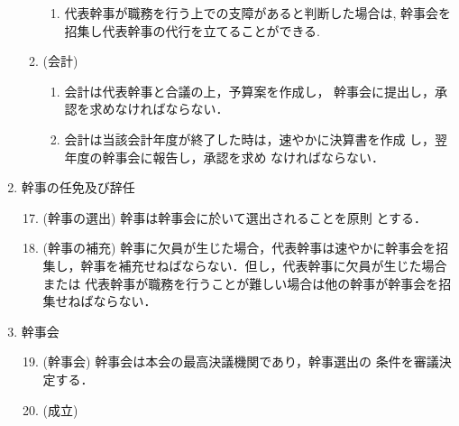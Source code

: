 \begin{enumerate}
\begin{enumerate}
\begin{enumerate}
	\item	代表幹事が職務を行う上での支障があると判断した場合は,
幹事会を招集し代表幹事の代行を立てることができる. \\
\end{enumerate}
%
\item	(会計)
\begin{enumerate}
	\item	会計は代表幹事と合議の上，予算案を作成し，
				幹事会に提出し，承認を求めなければならない．\\
	\item	会計は当該会計年度が終了した時は，速やかに決算書を作成
				し，翌年度の幹事会に報告し，承認を求め
なければならない．\\
\end{enumerate}
%
\end{enumerate}
%
\newpage
\item	幹事の任免及び辞任\\
%
\begin{enumerate}
\setcounter{enumii}{16}
\item	(幹事の選出) 幹事は幹事会に於いて選出されることを原則
				とする．\\
%
\item (幹事の補充) 幹事に欠員が生じた場合，代表幹事は速やかに幹事会を招
集し，幹事を補充せねばならない．但し，代表幹事に欠員が生じた場合または
代表幹事が職務を行うことが難しい場合は他の幹事が幹事会を招集せねばならない．\\
\end{enumerate}
%
\item    幹事会\\
%
\begin{enumerate}
\setcounter{enumii}{18}
\item    (幹事会) 幹事会は本会の最高決議機関であり，幹事選出の
                条件を審議決定する．\\
%
\item    (成立) 

\end{enumerate}
\end{enumerate}
